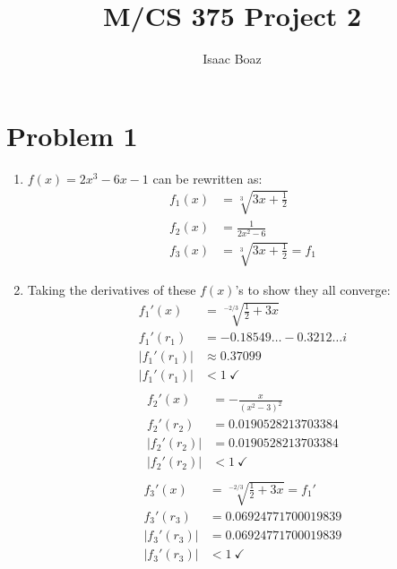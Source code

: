 \documentclass{article}
\title{\vspace{-5ex}M/CS 375 Project 2}
\author{Isaac Boaz}
\begin{document}
\maketitle

\section*{Problem 1}
\begin{enumerate}[label=(\alph*)]
    \item \(f(x) = 2x^3 - 6x - 1\) can be rewritten as:
        \begin{align*}
            f_1(x) & = \sqrt[3]{3x+\frac{1}{2}} \\
            f_2(x) & = \frac{1}{2x^2-6}  \\
            f_3(x) & = \sqrt[3]{3x+\frac{1}{2}} = f_1
        \end{align*}
    \item Taking the derivatives of these \(f(x)\)'s to show they all converge:
        \begin{align*}
            f_1'(x) &= \sqrt[-2/3]{\frac{1}{2} + 3x}\ \\
                    f_1'(r_1) & = -0.18549\ldots - 0.3212\ldots i \\
                    |f_1'(r_1)| & \approx 0.37099 \\
                    |f_1'(r_1)| & < 1\ \checkmark \\
        \end{align*}
        \begin{align*}
            f_2'(x) &= -\frac{x}{(x^2-3)^2} \\
                    f_2'(r_2) & = 0.0190528213703384 \\
                    |f_2'(r_2)| & = 0.0190528213703384 \\
                    |f_2'(r_2)| & < 1\ \checkmark \\
        \end{align*}
        \begin{align*}
            f_3'(x) &= \sqrt[-2/3]{\frac{1}{2} + 3x} = f_1' \\
            f_3'(r_3) &= 0.06924771700019839 \\
            |f_3'(r_3)|& = 0.06924771700019839 \\
            |f_3'(r_3)| &< 1\ \checkmark
        \end{align*}
\end{enumerate}

\pagebreak
\end{document}
